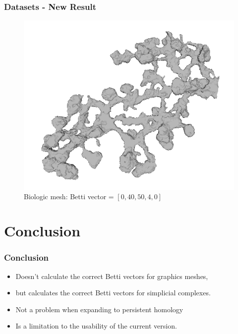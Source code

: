 \documentclass{beamer}
\begin{document}
\begin{frame}
\frametitle{Datasets - New Result}
\begin{figure}
\center
\includegraphics[scale=0.5]{testmesh00.png}
\caption{Biologic mesh: Betti vector = $[0,40,50,4,0]$}
\end{figure}
\end{frame}

\section{Conclusion}
\begin{frame}
\frametitle{Conclusion}
\begin{itemize}
\item Doesn't calculate the correct Betti vectors for graphics meshes,
\item but calculates the correct Betti vectors for simplicial complexes.
\item Not a problem when expanding to persistent homology
\item Is a limitation to the usability of the current version.
\end{itemize}
\end{frame}
\end{document}
